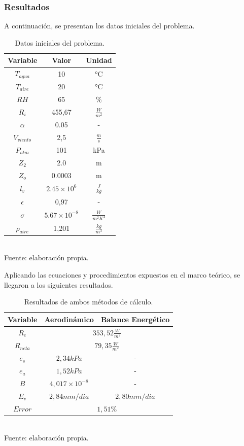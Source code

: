 \documentclass{article}  %
\begin{document}
\subsubsection{Resultados}

A continuación, se presentan los datos iniciales del problema.

\begin{table}[H]
  \centering
  \caption{Datos iniciales del problema.}
  \begin{tabular}{|c|c|c|}
    \hline
    \textbf{Variable} & \textbf{Valor} & \textbf{Unidad}\\
    \hline
    $T_{agua}$ & 10 & °C\\
    $T_{aire}$ & 20 & °C\\
    $RH$ & 65 & \%\\
    $R_i$ & 455,67 & $\frac{W}{m^2}$\\
    $\alpha$ & 0.05 & - \\
    $V_{viento}$ & 2,5 & $\frac{m}{s}$\\
    $P_{atm}$ & 101 & kPa\\
    $Z_2$ & 2.0 & m\\
    $Z_o$ & 0.0003 & m\\
    $l_v$ & $2.45 \times 10^6$ & $\frac{J}{kg}$\\
    $\epsilon$ & 0,97 & -\\
    $\sigma$ & $5.67 \times 10^{-8}$ & $\frac{W}{m^2K^4}$\\
    $\rho_{aire}$ & 1,201 & $\frac{kg}{m^3}$\\
    \hline
  \end{tabular}
  \\ Fuente: elaboración propia.
\end{table}

Aplicando las ecuaciones y procedimientos expuestos en el marco teórico, se llegaron a los siguientes resultados.

\begin{table}[H]
  \centering
  \caption{Resultados de ambos métodos de cálculo.}
  \begin{tabular}{|c|c|c|}
      \hline
      Variable & Aerodinámico & Balance Energético \\ \hline
      $R_e$ & \multicolumn{2}{|c|}{$353,52 \frac{W}{m^2}$} \\ \hline
      $R_{neta}$ & \multicolumn{2}{|c|}{$79,35 \frac{W}{m^2}$} \\ \hline
      $e_s$ & $2,34 kPa$ & - \\ \hline
      $e_a$ & $1,52 kPa$ & - \\ \hline
      $B$ & $4,017 \times 10^{-8}$ & - \\ \hline
      $E_v$ & $2,84 mm/dia$ & $2,80 mm/dia$ \\ \hline
      $Error$ & \multicolumn{2}{|c|}{$1,51 \%$} \\ \hline
  \end{tabular}
  \\ Fuente: elaboración propia.
\end{table}
\end{document}
